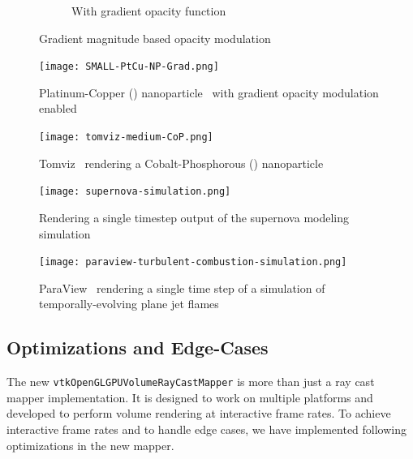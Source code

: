\begin{figure}[htb]
\begin{subfigure}[b]{0.5\columnwidth}
    \caption{With gradient opacity function}
    \label{fig:Ng2}
  \end{subfigure}
  \caption{Gradient magnitude based opacity modulation}
  \label{fig:gradient}
\end{figure}

\begin{figure}[htb]
  \centering
  \texttt{[image: SMALL-PtCu-NP-Grad.png]}
  \caption{Platinum-Copper () nanoparticle~\protect\citep{scott_electron_2012,
           miao_atomic_2016} with gradient opacity modulation enabled}
  \label{fig:ptcu-grad}
\end{figure}

\begin{figure}[htb]
  \centering
  \texttt{[image: tomviz-medium-CoP.png]}
  \caption{Tomviz~\protect\citep{hanwell_tomviz_2014} rendering a
           Cobalt-Phosphorous ()
           nanoparticle~\protect\citep{levin_nanomaterial_2016}}
  \label{fig:tomviz-cop}
\end{figure}

\begin{figure}[htb]
  \centering
  \texttt{[image: supernova-simulation.png]}
  \caption{Rendering a single timestep output of the supernova modeling
  simulation~\protect\citep{blondin_pulsar_2007}}
  \label{fig:supernova}
\end{figure}

\begin{figure}[htb]
  \centering
  \texttt{[image: paraview-turbulent-combustion-simulation.png]}
  \caption{ParaView~\protect\citep{ahrens_paraview:_2005, ayachit_paraview_2015,
  ayachit_paraview_2015-1} rendering a single time step of a simulation of
  temporally-evolving plane jet
  flames~\protect\citep{hiroshi_akiba_visualizing_2007}}
  \label{fig:paraview-turbulent-combustion}
\end{figure}



\subsection{Optimizations and Edge-Cases} The new
\texttt{vtkOpenGLGPUVolumeRayCastMapper} is more than just a ray cast mapper
implementation. It is designed to work on multiple platforms and developed to
perform volume rendering at interactive frame rates. To achieve interactive
frame rates and to handle edge cases, we have implemented following
optimizations in the new mapper.

